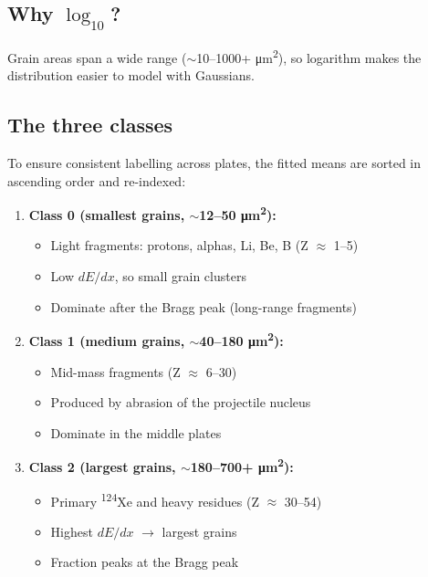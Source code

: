 \documentclass[12pt,a4paper]{article}
\begin{document}
\subsection{Why $\log_{10}$?}

Grain areas span a wide range ($\sim$10--1000+
\si{\micro\meter\squared}), so logarithm makes the distribution easier
to model with Gaussians.

\subsection{The three classes}

To ensure consistent labelling across plates, the fitted means are
sorted in ascending order and re-indexed:

\begin{enumerate}
  \item \textbf{Class 0 (smallest grains, $\sim$12--50 \si{\micro\meter\squared}):}
        \begin{itemize}
          \item Light fragments: protons, alphas, Li, Be, B
                (Z $\approx$ 1--5)
          \item Low $dE/dx$, so small grain clusters
          \item Dominate after the Bragg peak (long-range fragments)
        \end{itemize}

  \item \textbf{Class 1 (medium grains, $\sim$40--180 \si{\micro\meter\squared}):}
        \begin{itemize}
          \item Mid-mass fragments (Z $\approx$ 6--30)
          \item Produced by abrasion of the projectile nucleus
          \item Dominate in the middle plates
        \end{itemize}

  \item \textbf{Class 2 (largest grains, $\sim$180--700+ \si{\micro\meter\squared}):}
        \begin{itemize}
          \item Primary \textsuperscript{124}Xe and heavy residues
                (Z $\approx$ 30--54)
          \item Highest $dE/dx$ $\rightarrow$ largest grains
          \item Fraction peaks at the Bragg peak
        \end{itemize}
\end{enumerate}
\end{document}
